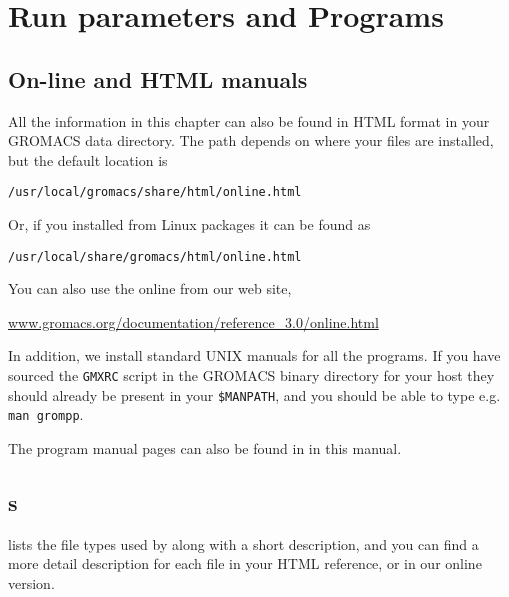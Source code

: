 %
% 
% 
% 
% 
% 
% 
% 
% 
%

\chapter{Run parameters and Programs}
\label{ch:programs}

\section{On-line and HTML manuals}
All the information in this chapter can also be found in HTML
format in your GROMACS data directory. The path depends on
where your files are installed, but the default location is \\
\centerline{\tt /usr/local/gromacs/share/html/online.html}
Or, if you installed from Linux packages it can be found as\\
\centerline{\tt /usr/local/share/gromacs/html/online.html}
You can also use the online from our web site,\\
\centerline{\href{http://www.gromacs.org/documentation/reference_3.0/online.html}{www.gromacs.org/documentation/reference\_3.0/online.html}}

In addition, we install standard UNIX manuals for all the programs. If
you have sourced the {\tt GMXRC} script in the GROMACS binary directory for
your host they should already be present in your {\tt \$MANPATH}, and you
should be able to type e.g. {\tt man grompp}.

The program manual pages can also be found in
 in this manual.

\section{s}
\label{sec:fileformats}
 lists the file types used by {\gromacs} along with
a short description, and you can find a more detail description for
each file in your HTML reference, or in our online version.

